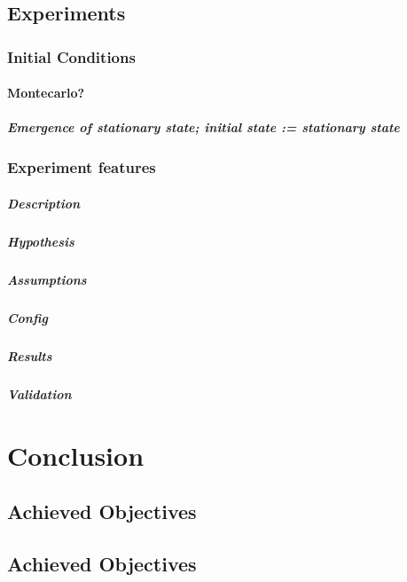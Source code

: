 \documentclass{report}
\begin{document}
	\section{Experiments}	
		\subsection{Initial Conditions}
			\subsubsection{Montecarlo?} 
			\paragraph{Emergence of stationary state; initial state := stationary state}
		\subsection{Experiment features}
			\paragraph{Description}
			\paragraph{Hypothesis}
			\paragraph{Assumptions}
			\paragraph{Config}
			\paragraph{Results}
			\paragraph{Validation}
	

\newpage 
\chapter{Conclusion}
      \section{Achieved Objectives}
      \section{Achieved Objectives}
\end{document}
